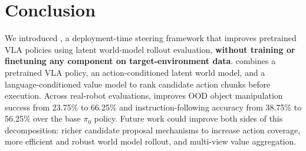 \section{Conclusion}

We introduced \textbf{\coolname{}}, a deployment-time steering framework that improves pretrained VLA policies using latent world-model rollout evaluation, \textbf{without training or finetuning any component on target-environment data}. \coolname{} combines a pretrained VLA policy, an action-conditioned latent world model, and a language-conditioned value model to rank candidate action chunks before execution. Across real-robot evaluations, \coolname{} improves OOD object manipulation success from 23.75\% to 66.25\% and instruction-following accuracy from 38.75\% to 56.25\% over the base $\pi_0$ policy. Future work could improve both sides of this decomposition: richer candidate proposal mechanisms to increase action coverage, more efficient and robust world model rollout, and multi-view value aggregation.